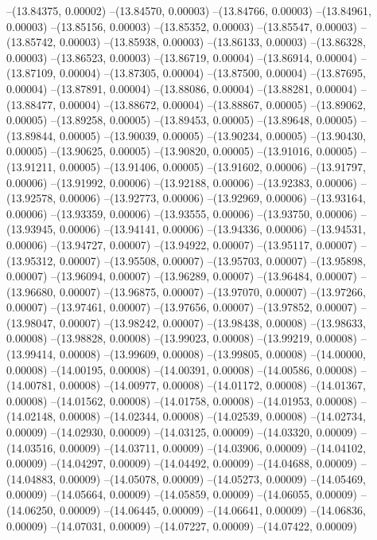 --(13.84375, 0.00002)
--(13.84570, 0.00003)
--(13.84766, 0.00003)
--(13.84961, 0.00003)
--(13.85156, 0.00003)
--(13.85352, 0.00003)
--(13.85547, 0.00003)
--(13.85742, 0.00003)
--(13.85938, 0.00003)
--(13.86133, 0.00003)
--(13.86328, 0.00003)
--(13.86523, 0.00003)
--(13.86719, 0.00004)
--(13.86914, 0.00004)
--(13.87109, 0.00004)
--(13.87305, 0.00004)
--(13.87500, 0.00004)
--(13.87695, 0.00004)
--(13.87891, 0.00004)
--(13.88086, 0.00004)
--(13.88281, 0.00004)
--(13.88477, 0.00004)
--(13.88672, 0.00004)
--(13.88867, 0.00005)
--(13.89062, 0.00005)
--(13.89258, 0.00005)
--(13.89453, 0.00005)
--(13.89648, 0.00005)
--(13.89844, 0.00005)
--(13.90039, 0.00005)
--(13.90234, 0.00005)
--(13.90430, 0.00005)
--(13.90625, 0.00005)
--(13.90820, 0.00005)
--(13.91016, 0.00005)
--(13.91211, 0.00005)
--(13.91406, 0.00005)
--(13.91602, 0.00006)
--(13.91797, 0.00006)
--(13.91992, 0.00006)
--(13.92188, 0.00006)
--(13.92383, 0.00006)
--(13.92578, 0.00006)
--(13.92773, 0.00006)
--(13.92969, 0.00006)
--(13.93164, 0.00006)
--(13.93359, 0.00006)
--(13.93555, 0.00006)
--(13.93750, 0.00006)
--(13.93945, 0.00006)
--(13.94141, 0.00006)
--(13.94336, 0.00006)
--(13.94531, 0.00006)
--(13.94727, 0.00007)
--(13.94922, 0.00007)
--(13.95117, 0.00007)
--(13.95312, 0.00007)
--(13.95508, 0.00007)
--(13.95703, 0.00007)
--(13.95898, 0.00007)
--(13.96094, 0.00007)
--(13.96289, 0.00007)
--(13.96484, 0.00007)
--(13.96680, 0.00007)
--(13.96875, 0.00007)
--(13.97070, 0.00007)
--(13.97266, 0.00007)
--(13.97461, 0.00007)
--(13.97656, 0.00007)
--(13.97852, 0.00007)
--(13.98047, 0.00007)
--(13.98242, 0.00007)
--(13.98438, 0.00008)
--(13.98633, 0.00008)
--(13.98828, 0.00008)
--(13.99023, 0.00008)
--(13.99219, 0.00008)
--(13.99414, 0.00008)
--(13.99609, 0.00008)
--(13.99805, 0.00008)
--(14.00000, 0.00008)
--(14.00195, 0.00008)
--(14.00391, 0.00008)
--(14.00586, 0.00008)
--(14.00781, 0.00008)
--(14.00977, 0.00008)
--(14.01172, 0.00008)
--(14.01367, 0.00008)
--(14.01562, 0.00008)
--(14.01758, 0.00008)
--(14.01953, 0.00008)
--(14.02148, 0.00008)
--(14.02344, 0.00008)
--(14.02539, 0.00008)
--(14.02734, 0.00009)
--(14.02930, 0.00009)
--(14.03125, 0.00009)
--(14.03320, 0.00009)
--(14.03516, 0.00009)
--(14.03711, 0.00009)
--(14.03906, 0.00009)
--(14.04102, 0.00009)
--(14.04297, 0.00009)
--(14.04492, 0.00009)
--(14.04688, 0.00009)
--(14.04883, 0.00009)
--(14.05078, 0.00009)
--(14.05273, 0.00009)
--(14.05469, 0.00009)
--(14.05664, 0.00009)
--(14.05859, 0.00009)
--(14.06055, 0.00009)
--(14.06250, 0.00009)
--(14.06445, 0.00009)
--(14.06641, 0.00009)
--(14.06836, 0.00009)
--(14.07031, 0.00009)
--(14.07227, 0.00009)
--(14.07422, 0.00009)
